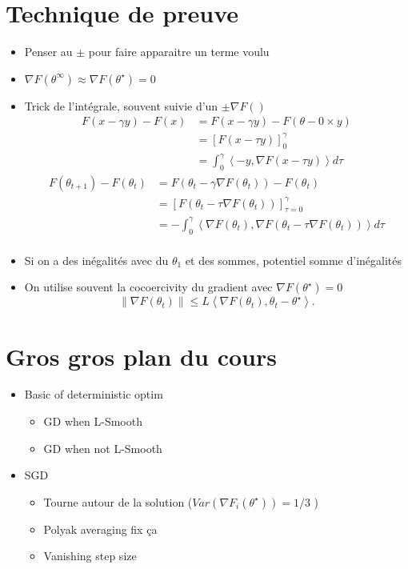 \documentclass{article}
\theoremstyle{plain}%
\theoremstyle{definition}
\theoremstyle{remark}
\begin{document}
\section{Technique de preuve}
\begin{itemize}
    \item Penser au $ \pm  $ pour faire apparaitre un terme voulu
    \item $ \nabla F(\theta ^\infty ) \approx \nabla F(\theta ^\star ) = 0 $ 
    \item Trick de l'intégrale, souvent suivie d'un $ \pm \nabla F() $ \begin{align*}
        F(x - \gamma y) - F(x) &= F(x - \gamma y) - F(\theta - 0 \times y) \\
        &= \left[ F(x - \tau y) \right]_0 ^\gamma \\
        &= \int_{0}^{\gamma } \left\langle -y, \nabla F(x - \tau y) \right\rangle d \tau
    \end{align*}
    \begin{align*}
        F(\theta _{t+1}) - F(\theta _t) 
        &= F(\theta _t - \gamma \nabla F(\theta _t)) - F(\theta _t) \\
        &= [F(\theta _t - \tau \nabla F(\theta _t))]^\gamma _{\tau = 0} \\
        &= -\int_{0}^{\gamma } \left\langle \nabla F(\theta _t), \nabla F(\theta _t - \tau \nabla F(\theta _t)) \right\rangle d \tau \\
    \end{align*}
    \item Si on a des inégalités avec du $ \theta _1 $ et des sommes, potentiel somme d'inégalités
    \item On utilise souvent la cocoercivity du gradient avec $ \nabla F(\theta ^\star ) = 0 $ 
    \[
        \left\| \nabla F(\theta _t) \right\| \leq L \left\langle \nabla F(\theta _t), \theta _t - \theta ^\star  \right\rangle 
    .\]
\end{itemize}

\section{Gros gros plan du cours}
\begin{itemize}
    \item Basic of deterministic optim
    \begin{itemize}
        \item GD when L-Smooth
        \item GD when not L-Smooth
    \end{itemize}
    \item SGD \begin{itemize}
        \item Tourne autour de la solution ($ Var(\nabla F_i(\theta ^\star )) = 1/3 $ )
        \item Polyak averaging fix ça 
        \item Vanishing step size 
    \end{itemize}
\end{itemize}
\end{document}
